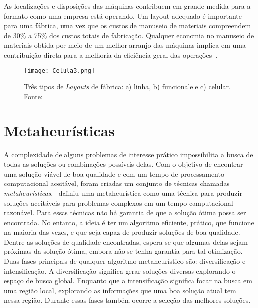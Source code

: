 As localizações e disposições das máquinas contribuem em grande medida para a formato como uma empresa está operando. Um layout adequado é importante para uma fábrica, uma vez que os custos de manuseio de materiais compreendem de 30\% a 75\% dos custos totais de fabricação. Qualquer economia no manuseio de materiais obtida por meio de um melhor arranjo das máquinas implica em uma contribuição direta para a melhoria da eficiência geral das operações~\citep{sule2008manufacturing}. 

\begin{figure}[t]
\begin{center}
\texttt{[image: Celula3.png]}
\caption{Três tipos de {\it Layouts} de fábrica: a) linha, b) funcionale e c) celular. Fonte:~\cite{irani1999handbook}}\label{fig:03}
\end{center}
\end{figure}


\section{Metaheurísticas}

A complexidade de alguns problemas de interesse prático impossibilita a busca de todas as soluções ou combinações possíveis delas. Com o objetivo de encontrar uma solução viável de boa qualidade e com um tempo de processamento computacional aceitável, foram criadas um conjunto de técnicas chamadas {\it metaheurísticas}.~\cite{kaveh2014advances} definiu uma metaheurística como uma técnica para produzir soluções aceitáveis para problemas complexos em um tempo computacional razonável. Para essas técnicas não há garantia de que a solução ótima possa ser encontrada. No entanto, a ideia é ter um algoritmo eficiente, prático, que funcione na maioria das vezes, e que seja capaz de produzir soluções de boa qualidade. Dentre as soluções de qualidade encontradas, espera-se que algumas delas sejam próximas da solução ótima, embora não se tenha garantia para tal otimização. Duas fases principais de qualquer algoritmo metaheurístico são: diversificação e intensificação. A diversificação significa gerar soluções diversas explorando o espaço de busca global. Enquanto que a intensificação significa focar na busca em uma região local, explorando as informações que uma boa solução atual tem nessa região. Durante essas fases também ocorre a seleção das melhores soluções. 

